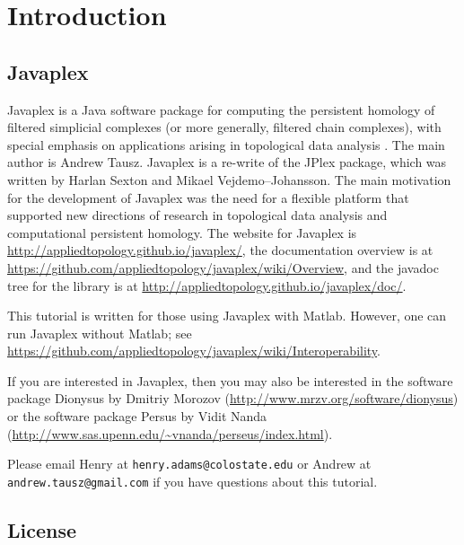 \documentclass[amscd, amssymb, verbatim]{amsart}[12pt]
\theoremstyle{remark}
\theoremstyle{remark}
\theoremstyle{remark}
\begin{document}




\section{Introduction}


\subsection{Javaplex}

Javaplex is a Java software package for computing the persistent homology of filtered simplicial complexes (or more generally, filtered chain complexes), with special emphasis on applications arising in topological data analysis \citep{Javaplex}. The main author is Andrew Tausz. Javaplex is a re-write of the JPlex package, which was written by Harlan Sexton and Mikael Vejdemo--Johansson. The main motivation for the development of Javaplex was the need for a flexible platform that supported new directions of research in topological data analysis and computational persistent homology. The website for Javaplex is \url{http://appliedtopology.github.io/javaplex/}, the documentation overview is at \url{https://github.com/appliedtopology/javaplex/wiki/Overview}, and the javadoc tree for the library is at \url{http://appliedtopology.github.io/javaplex/doc/}.

This tutorial is written for those using Javaplex with Matlab. However, one can run Javaplex without Matlab; see \url{https://github.com/appliedtopology/javaplex/wiki/Interoperability}.

If you are interested in Javaplex, then you may also be interested in the software package Dionysus by Dmitriy Morozov (\url{http://www.mrzv.org/software/dionysus}) or the software package Persus by Vidit Nanda (\url{http://www.sas.upenn.edu/~vnanda/perseus/index.html}).


Please email Henry at \texttt{henry.adams@colostate.edu} or Andrew at \texttt{andrew.tausz@gmail.com} if you have questions about this tutorial.


\subsection{License}
\end{document}
